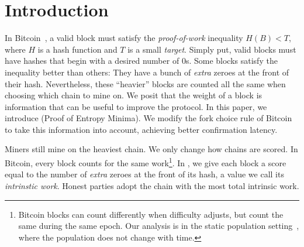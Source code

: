 \section{Introduction}

In Bitcoin~\cite{bitcoin}, a valid block must satisfy the
\emph{proof-of-work} inequality $H(B) < T$, where
$H$ is a hash function and $T$ is a small \emph{target}.
Simply put, valid blocks must have hashes that begin with a desired number of $0$s.
Some blocks satisfy the inequality better than others:
They have a bunch of \emph{extra} zeroes at the front of their hash.
Nevertheless, these ``heavier'' blocks are counted all the same when choosing
which chain to mine on.
We posit that the weight of a block is information
that can be useful to improve the protocol.
In this paper, we introduce \emph{\poem} (Proof of Entropy Minima).
We modify the fork choice rule of Bitcoin to take this information into account,
achieving better confirmation latency.

\noindent
{}
Miners still mine on the heaviest chain. We only change how chains are scored.
In Bitcoin, every block counts for the same work\footnote{Bitcoin blocks can count differently when
difficulty adjusts, but count the same during the same epoch. Our analysis is in the
static population setting~\cite{backbone}, where the population does not change with time.}.
In \poem, we give each block a score equal to the number of \emph{extra} zeroes at the front of its hash,
a value we call its \emph{intrinstic work}. Honest parties adopt the chain with the most total
intrinsic work.

